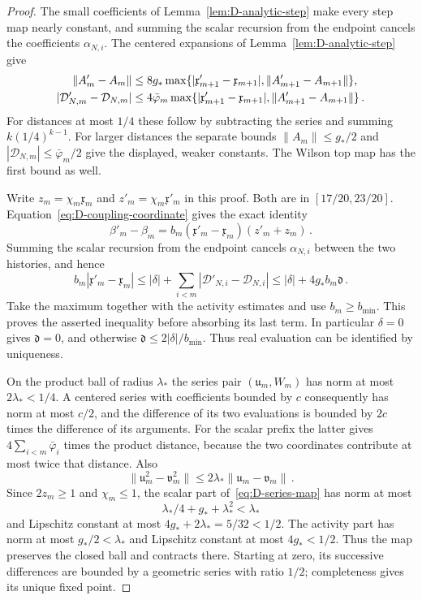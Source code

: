 \begin{proof}
The small coefficients of Lemma~\ref{lem:D-analytic-step} make every step map nearly constant, and summing the scalar recursion from the endpoint cancels the coefficients $\alpha_{N,i}$. The centered expansions of Lemma~\ref{lem:D-analytic-step} give
\begin{align}\label{eq:D-local-lipschitz}
\|A'_m-A_m\|&\le8g_*\max\{|\mathfrak x'_{m+1}-\mathfrak x_{m+1}|,\|A'_{m+1}-A_{m+1}\|\},\notag\\
|\mathcal D'_{N,m}-\mathcal D_{N,m}|&\le4\bar\varphi_m\max\{|\mathfrak x'_{m+1}-\mathfrak x_{m+1}|,\|A'_{m+1}-A_{m+1}\|\}\,.
\end{align}
For distances at most $1/4$ these follow by subtracting the series and summing $k(1/4)^{k-1}$. For larger distances the separate bounds $\|A_m\|\le g_*/2$ and $|\mathcal D_{N,m}|\le \bar\varphi_m/2$ give the displayed, weaker constants. The Wilson top map has the first bound as well.

Write $z_m=\chi_m\mathfrak x_m$ and $z'_m=\chi_m\mathfrak x'_m$ in this proof. Both are in $[17/20,23/20]$. Equation~\eqref{eq:D-coupling-coordinate} gives the exact identity
\begin{equation*}
\beta'_m-\beta_m=b_m(\mathfrak x'_m-\mathfrak x_m)(z'_m+z_m)\,.
\end{equation*}
Summing the scalar recursion from the endpoint cancels $\alpha_{N,i}$ between the two histories, and hence
\begin{equation*}
b_m|\mathfrak x'_m-\mathfrak x_m|\le|\delta|+\sum_{i<m}|\mathcal D'_{N,i}-\mathcal D_{N,i}|
\le|\delta|+4g_*b_m \mathfrak d\,.
\end{equation*}
Take the maximum together with the activity estimates and use $b_m\ge b_{\min}$. This proves the asserted inequality before absorbing its last term. In particular $\delta=0$ gives $\mathfrak d=0$, and otherwise $\mathfrak d\le2|\delta|/b_{\min}$. Thus real evaluation can be identified by uniqueness.


On the product ball of radius $\lambda_*$ the series pair $(\mathfrak u_m,W_m)$ has norm at most $2\lambda_*<1/4$. A centered series with coefficients bounded by $c$ consequently has norm at most $c/2$, and the difference of its two evaluations is bounded by $2c$ times the difference of its arguments. For the scalar prefix the latter gives $4\sum_{i<m}\bar\varphi_i$ times the product distance, because the two coordinates contribute at most twice that distance. Also
\begin{equation*}
\|\mathfrak u_m^2-\mathfrak v_m^2\|\le2\lambda_*\|\mathfrak u_m-\mathfrak v_m\|\,.
\end{equation*}
Since $2z_m\ge1$ and $\chi_m\le1$, the scalar part of~\eqref{eq:D-series-map} has norm at most
\begin{equation*}
\lambda_*/4+g_*+\lambda_*^2<\lambda_*
\end{equation*}
and Lipschitz constant at most $4g_*+2\lambda_*=5/32<1/2$. The activity part has norm at most $g_*/2<\lambda_*$ and Lipschitz constant at most $4g_*<1/2$. Thus the map preserves the closed ball and contracts there. Starting at zero, its successive differences are bounded by a geometric series with ratio $1/2$; completeness gives its unique fixed point. 


\end{proof}

